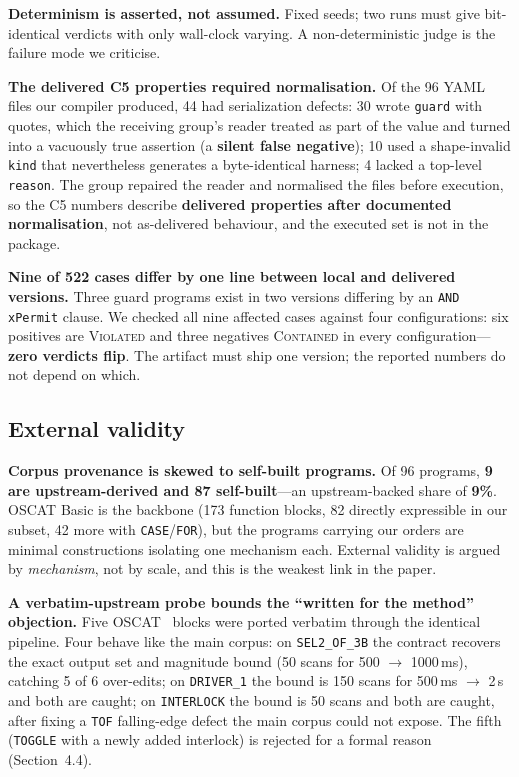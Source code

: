 \documentclass[acmsmall,screen,review,anonymous]{acmart}
\begin{document}
\textbf{Determinism is asserted, not assumed.} Fixed seeds; two runs must give bit-identical verdicts with only wall-clock varying. A non-deterministic judge is the failure mode we criticise.

\textbf{The delivered C5 properties required normalisation.} Of the 96 YAML files our compiler produced, 44 had serialization defects: 30 wrote \texttt{guard} with quotes, which the receiving group's reader treated as part of the value and turned into a vacuously true assertion (a \textbf{silent false negative}); 10 used a shape-invalid \texttt{kind} that nevertheless generates a byte-identical harness; 4 lacked a top-level \texttt{reason}. The group repaired the reader and normalised the files before execution, so the C5 numbers describe \textbf{delivered properties after documented normalisation}, not as-delivered behaviour, and the executed set is not in the package.

\textbf{Nine of 522 cases differ by one line between local and delivered versions.} Three guard programs exist in two versions differing by an \texttt{AND xPermit} clause. We checked all nine affected cases against four configurations: six positives are \textsc{Violated} and three negatives \textsc{Contained} in every configuration---\textbf{zero verdicts flip}. The artifact must ship one version; the reported numbers do not depend on which.

\subsection{External validity}

\textbf{Corpus provenance is skewed to self-built programs.} Of 96 programs, \textbf{9 are upstream-derived and 87 self-built}---an upstream-backed share of \textbf{9\%}. OSCAT Basic is the backbone (173 function blocks, 82 directly expressible in our subset, 42 more with \texttt{CASE}/\texttt{FOR}), but the programs carrying our orders are minimal constructions isolating one mechanism each. External validity is argued by \emph{mechanism}, not by scale, and this is the weakest link in the paper.

\textbf{A verbatim-upstream probe bounds the ``written for the method'' objection.} Five OSCAT~\citep{oscat} blocks were ported verbatim through the identical pipeline. Four behave like the main corpus: on \texttt{SEL2\_OF\_3B} the contract recovers the exact output set and magnitude bound (50 scans for 500 $\to$ 1000\,ms), catching 5 of 6 over-edits; on \texttt{DRIVER\_1} the bound is 150 scans for 500\,ms $\to$ 2\,s and both are caught; on \texttt{INTERLOCK} the bound is 50 scans and both are caught, after fixing a \texttt{TOF} falling-edge defect the main corpus could not expose. The fifth (\texttt{TOGGLE} with a newly added interlock) is rejected for a formal reason (Section~4.4).
\end{document}
